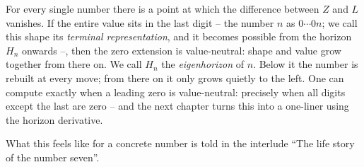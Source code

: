 For every single number there is a point at which the difference
between $Z$ and $L$ vanishes. If the entire value sits in the last
digit -- the number $n$ as $0\cdots0n$; we call this shape its
\emph{terminal representation}, and it becomes possible from the
horizon $H_n$ onwards --, then the zero extension is
value-neutral: shape and value grow together from there on. We
call $H_n$ the \emph{eigenhorizon} of $n$. Below it the number is
rebuilt at every move; from there on it only grows quietly to the
left. One can compute exactly when a leading zero is
value-neutral: precisely when all digits except the last are zero
-- and the next chapter turns this into a one-liner using the
horizon derivative.

What this feels like for a concrete number is told in the
interlude ``The life story of the number seven''.
